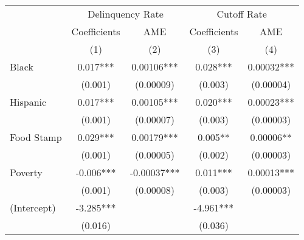 \begin{tabular}{lcccc}
\toprule 
\midrule 
 & \multicolumn{2}{c}{Delinquency Rate} & \multicolumn{2}{c}{Cutoff Rate} \\
 \cmidrule(lr){2-3} \cmidrule(lr){4-5} 
 & Coefficients & AME & Coefficients & AME \\
 & (1) & (2) & (3) & (4) \\
\midrule 
Black & 0.017*** & 0.00106*** & 0.028*** & 0.00032*** \\
 & (0.001) & (0.00009) & (0.003) & (0.00004) \\
Hispanic & 0.017*** & 0.00105*** & 0.020*** & 0.00023*** \\
 & (0.001) & (0.00007) & (0.003) & (0.00003) \\
Food Stamp & 0.029*** & 0.00179*** & 0.005** & 0.00006** \\
 & (0.001) & (0.00005) & (0.002) & (0.00003) \\
Poverty & -0.006*** & -0.00037*** & 0.011*** & 0.00013*** \\
 & (0.001) & (0.00008) & (0.003) & (0.00003) \\
(Intercept) & -3.285*** &  & -4.961*** &  \\
 & (0.016) &  & (0.036) &  \\
\midrule 
\bottomrule 
\end{tabular}
